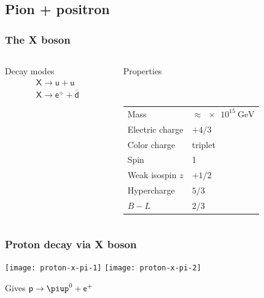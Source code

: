 \documentclass[english, fleqn]{beamer}
\begin{document}
\subsection{Pion + positron}

\begin{frame}
    \frametitle{The X boson}

    \begin{columns}[t]
        \begin{column}{.5\textwidth}
            \begin{block}{Decay modes}
                \begin{gather*}
                    \mathsf X \to \mathsf u + \mathsf u \\
                    \mathsf X \to \mathsf e^+ + \bar{\mathsf d}
                \end{gather*}
            \end{block}
        \end{column}
        \begin{column}{.5\textwidth}
            \begin{block}{Properties}

                \

                \begin{tabular}{ll}
                    Mass & $\approx \SI{e15}{\giga\electronvolt}$ \\
                    Electric charge & $+4/3$ \\
                    Color charge & triplet \\
                    Spin & 1 \\
                    Weak isospin $z$ & $+1/2$ \\
                    Hypercharge & $5/3$ \\
                    $B - L$ & $2/3$
                \end{tabular}
            \end{block}
        \end{column}
    \end{columns}

\end{frame}

\begin{frame}
    \frametitle{Proton decay via X boson}

    \begin{center}
        \texttt{[image: proton-x-pi-1]}
        \pause
        \hfill
        \texttt{[image: proton-x-pi-2]}
    \end{center}

    \begin{center}
        Gives $\mathsf p \to \piup^0 + \mathsf e^+$
    \end{center}
\end{frame}
\end{document}
